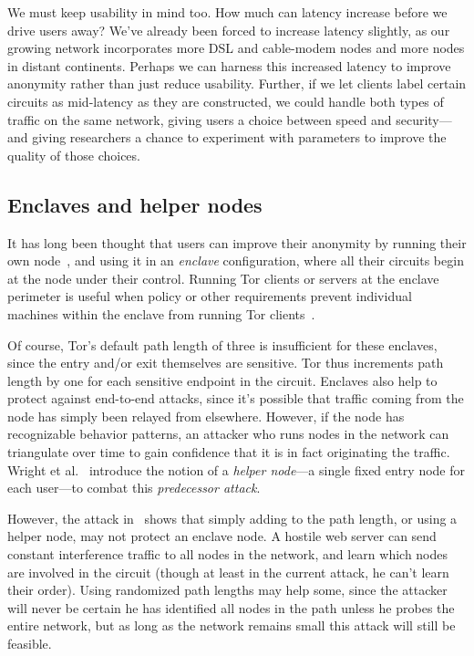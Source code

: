 \documentclass{llncs}
\begin{document}
We must keep usability in mind too. How much can latency increase
before we drive users away? We've already been forced to increase
latency slightly, as our growing network incorporates more DSL and
cable-modem nodes and more nodes in distant continents. Perhaps we can
harness this increased latency to improve anonymity rather than just
reduce usability. Further, if we let clients label certain circuits as
mid-latency as they are constructed, we could handle both types of traffic
on the same network, giving users a choice between speed and security---and
giving researchers a chance to experiment with parameters to improve the
quality of those choices.

\subsection{Enclaves and helper nodes}
\label{subsec:helper-nodes}

It has long been thought that users can improve their anonymity by
running their own node~\cite{tor-design,or-ih96,or-pet00}, and using
it in an \emph{enclave} configuration, where all their circuits begin
at the node under their control. Running Tor clients or servers at
the enclave perimeter is useful when policy or other requirements
prevent individual machines within the enclave from running Tor
clients~\cite{or-jsac98,or-discex00}.

Of course, Tor's default path length of
three is insufficient for these enclaves, since the entry and/or exit
themselves are sensitive. Tor thus increments path length by one
for each sensitive endpoint in the circuit.
Enclaves also help to protect against end-to-end attacks, since it's
possible that traffic coming from the node has simply been relayed from
elsewhere. However, if the node has recognizable behavior patterns,
an attacker who runs nodes in the network can triangulate over time to
gain confidence that it is in fact originating the traffic. Wright et
al.~\cite{wright03} introduce the notion of a \emph{helper node}---a
single fixed entry node for each user---to combat this \emph{predecessor
attack}.

However, the attack in~\cite{attack-tor-oak05} shows that simply adding
to the path length, or using a helper node, may not protect an enclave
node. A hostile web server can send constant interference traffic to
all nodes in the network, and learn which nodes are involved in the
circuit (though at least in the current attack, he can't learn their
order). Using randomized path lengths may help some, since the attacker
will never be certain he has identified all nodes in the path unless
he probes the entire network, but as
long as the network remains small this attack will still be feasible.
\end{document}
